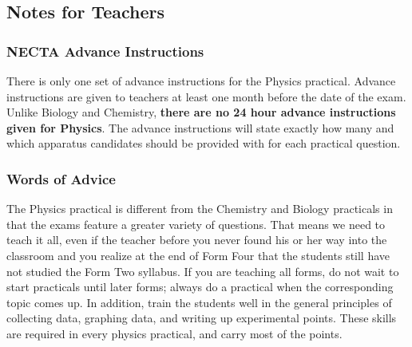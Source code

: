 \subsection{Notes for Teachers}

\subsubsection{NECTA Advance Instructions}
There is only one set of advance instructions for the Physics practical. Advance instructions are given to teachers at least one month before the date of the exam. Unlike Biology and Chemistry, \textbf{there are no 24 hour advance instructions given for Physics}.  The advance instructions will state exactly how many and which apparatus candidates should be provided with for each practical question.


\subsubsection{Words of Advice}

The Physics practical is different from the Chemistry and Biology practicals in that
the exams feature a greater variety of questions. That means we need to teach it all, even if the teacher before you never found his or her way into the classroom and you realize at the end of Form Four that the students still have not studied the Form Two syllabus. If you are teaching all forms, do not wait to start practicals until later forms; always do a practical when the corresponding topic comes up. In addition, train the students well in the general principles of collecting data, graphing data, and writing up experimental points. These skills are required in every physics practical, and carry most of the points.

